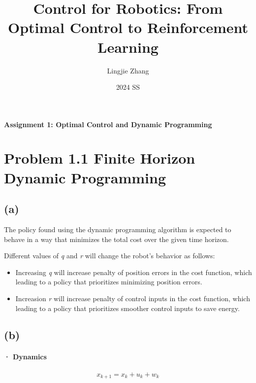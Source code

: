 \documentclass[8pt, a4paper, oneside, justified]{article}
\title{Control for Robotics: From Optimal Control to Reinforcement Learning}
\author{Lingjie Zhang}
\date{2024 SS}
\numberwithin{equation}{section}
\begin{document}
\maketitle

\begin{center}
    \textbf{Assignment 1: Optimal Control and Dynamic Programming}
\end{center}

\tableofcontents
\newpage
{}


\section*{Problem 1.1 Finite Horizon Dynamic Programming}
\setcounter{equation}{0} %
\subsection*{(a)}

The policy found using the dynamic programming algorithm is expected to behave in a way 
that minimizes the total cost over the given time horizon.

Different values of \textit{q} and \textit{r} will change the robot's behavior as follows:
\begin{itemize}
    \item Increasing \textit{q} will increase penalty of position errors in the cost function, 
    which leading to a policy that prioritizes minimizing position errors.
    \item Increasion \textit{r} will increase penalty of control inputs in the cost function, 
    which leading  to a policy that  prioritizes smoother control inputs to save energy.
\end{itemize}

\subsection*{(b)}
\paragraph*{· Dynamics}

\begin{align}
    x_{k+1}=x_k+u_k+w_k \\
\end{align}
\end{document}
